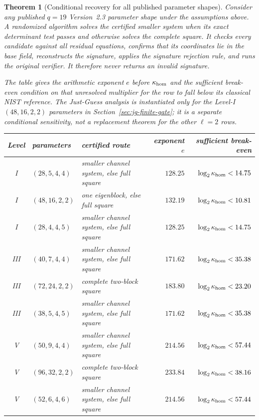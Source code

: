 \documentclass[11pt]{article}
\newtheorem{theorem}{Theorem}[section]
\begin{document}
\begin{theorem}[Conditional recovery for all published parameter shapes]
\label{thm:sq-all-nine}
Consider any published $q=19$ Version~2.3 parameter shape under the assumptions
above.  A randomized algorithm solves the certified smaller system when its
exact determinant test passes and otherwise solves the complete square.  It
checks every candidate against all residual equations, confirms that its
coordinates lie in the base field, reconstructs the signature, applies the
signature rejection rule, and runs the original verifier.  It therefore
never returns an invalid signature.

The table gives the arithmetic exponent $e$ before $\kappa_{\rm hom}$ and
the sufficient break-even condition on that unresolved multiplier for the row
to fall below its classical NIST reference.  The Just-Guess analysis is
instantiated only for the Level-I $(48,16,2,2)$ parameters in
Section~\ref{sec:jg-finite-gate}; it is a separate conditional sensitivity,
not a replacement theorem for the other $\ell=2$ rows.
\begin{center}
\small
\begin{tabularx}{\textwidth}{@{}c l >{\raggedright\arraybackslash}X r r@{}}
\toprule
Level & parameters & certified route & exponent $e$ & sufficient break-even\\
\midrule
I   & $(28,5,4,4)$  & smaller channel system, else full square & $128.25$ & $\log_2\kappa_{\rm hom}<14.75$\\
I   & $(48,16,2,2)$ & one eigenblock, else full square & $132.19$ & $\log_2\kappa_{\rm hom}<10.81$\\
I   & $(28,4,4,5)$  & smaller channel system, else full square & $128.25$ & $\log_2\kappa_{\rm hom}<14.75$\\
III & $(40,7,4,4)$  & smaller channel system, else full square & $171.62$ & $\log_2\kappa_{\rm hom}<35.38$\\
III & $(72,24,2,2)$ & complete two-block square & $183.80$ & $\log_2\kappa_{\rm hom}<23.20$\\
III & $(38,5,4,5)$  & smaller channel system, else full square & $171.62$ & $\log_2\kappa_{\rm hom}<35.38$\\
V   & $(50,9,4,4)$  & smaller channel system, else full square & $214.56$ & $\log_2\kappa_{\rm hom}<57.44$\\
V   & $(96,32,2,2)$ & complete two-block square & $233.84$ & $\log_2\kappa_{\rm hom}<38.16$\\
V   & $(52,6,4,6)$  & smaller channel system, else full square & $214.56$ & $\log_2\kappa_{\rm hom}<57.44$\\

\end{tabularx}
\end{center}
\end{theorem}
\end{document}
